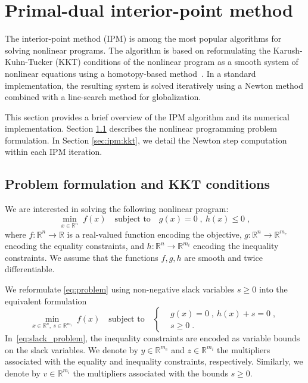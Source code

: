 \section{Primal-dual interior-point method}

The interior-point method (IPM) is among the most popular algorithms
for solving nonlinear programs. The algorithm is based on
reformulating the Karush-Kuhn-Tucker (KKT) conditions of the nonlinear program as a smooth
system of nonlinear equations using a homotopy-based method~\cite{nocedal_numerical_2006}.
In a standard implementation, the resulting system is solved iteratively using a Newton method combined with a line-search method for globalization.

This section provides a brief overview of the IPM algorithm and its numerical implementation.
Section \ref{sec:ipm:problem} describes the nonlinear programming problem formulation.
In Section \ref{sec:ipm:kkt}, we detail the Newton step computation within each IPM iteration.

\subsection{Problem formulation and KKT conditions}
\label{sec:ipm:problem}
We are interested in solving the following nonlinear program:
\begin{equation}
  \label{eq:problem}
    \min_{x \in \mathbb{R}^n} \;  f(x)
\quad \text{subject to}\quad
     g(x) = 0 \; , ~ h(x) \leq 0 \; ,
\end{equation}
where $f:\mathbb{R}^n \to \mathbb{R}$ is a real-valued function
encoding the objective, $g: \mathbb{R}^n \to \mathbb{R}^{m_e}$
encoding the equality constraints, and $h: \mathbb{R}^{n} \to
\mathbb{R}^{m_i}$ encoding the inequality constraints.
We assume that the functions $f, g, h$ are smooth
and twice differentiable.

We reformulate \eqref{eq:problem} using non-negative slack variables $s \geq 0$
into the equivalent formulation
\begin{equation}
  \label{eq:slack_problem}
    \min_{x \in \mathbb{R}^n, ~ s \in \mathbb{R}^{m_i}} \;  f(x)
    \quad \text{subject to} \quad
    \left\{
  \begin{aligned}
    & g(x) = 0 \; , ~ h(x) + s = 0 \; , \\
      &  s \geq 0  \; .
  \end{aligned}
  \right.
\end{equation}
In~\eqref{eq:slack_problem}, the inequality constraints
are encoded as variable bounds on the slack variables.
We denote by $y \in \mathbb{R}^{m_e}$ and $z \in \mathbb{R}^{m_i}$ the multipliers associated
with the equality and inequality constraints, respectively.
Similarly, we denote by $v \in \mathbb{R}^{m_i}$ the multipliers associated
with the bounds $s \geq 0$.

